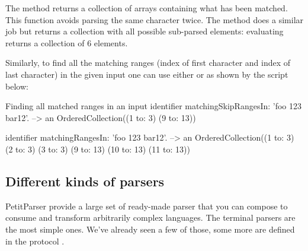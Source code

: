\documentclass[a4paper,10pt,twoside]{book}
\begin{document}
The  method returns a collection of arrays
containing what has been matched. This function avoids parsing the
same character twice. The method  does a similar
job but returns a collection with all possible sub-parsed elements:
\eg{} evaluating  returns a
collection of 6 elements.

Similarly, to find all the matching ranges (index of first character
and index of last character) in the given input one can use either
 or  as
shown by the script below:

\begin{script}{Finding all matched ranges in an input}
identifier matchingSkipRangesIn: 'foo 123 bar12'.
 --> an OrderedCollection((1 to: 3) (9 to: 13))

identifier matchingRangesIn: 'foo 123 bar12'.
 --> an OrderedCollection((1 to: 3) (2 to: 3) (3 to: 3) (9 to: 13) (10 to: 13) (11 to: 13))
\end{script}

\subsection{Different kinds of parsers}

PetitParser provide a large set of ready-made parser that you can
compose to consume and transform arbitrarily complex languages. The
terminal parsers are the most simple ones. We've already seen a few of
those, some more are defined in the protocol .
\end{document}
